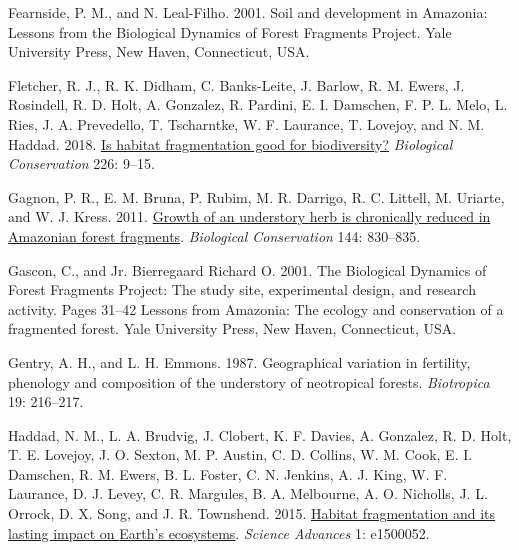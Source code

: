 \documentclass[
  12pt,
  man, donotrepeattitle,floatsintext]{apa6}
\newlength{\cslhangindent}
\newlength{\cslentryspacingunit} %
\newenvironment{CSLReferences}[2] %
 {%
  \setlength{\parindent}{0pt}
  \ifodd #1
  \let\oldpar\par
  \def\par{\hangindent=\cslhangindent\oldpar}
  \fi
  \setlength{\parskip}{#2\cslentryspacingunit}
 }%
 {}
\begin{document}
\begin{CSLReferences}{1}{0}
\leavevmode{}%
Fearnside, P. M., and N. Leal-Filho. 2001. Soil and development in {Amazonia}: {Lessons} from the {Biological} {Dynamics} of {Forest} {Fragments} {Project}. Yale University Press, New Haven, Connecticut, USA.

\leavevmode{}%
Fletcher, R. J., R. K. Didham, C. Banks-Leite, J. Barlow, R. M. Ewers, J. Rosindell, R. D. Holt, A. Gonzalez, R. Pardini, E. I. Damschen, F. P. L. Melo, L. Ries, J. A. Prevedello, T. Tscharntke, W. F. Laurance, T. Lovejoy, and N. M. Haddad. 2018. \href{https://doi.org/10.1016/j.biocon.2018.07.022}{Is habitat fragmentation good for biodiversity?} \emph{Biological Conservation} 226: 9--15.

\leavevmode{}%
Gagnon, P. R., E. M. Bruna, P. Rubim, M. R. Darrigo, R. C. Littell, M. Uriarte, and W. J. Kress. 2011. \href{https://doi.org/10.1016/j.biocon.2010.11.015}{Growth of an understory herb is chronically reduced in {Amazonian} forest fragments}. \emph{Biological Conservation} 144: 830--835.

\leavevmode{}%
Gascon, C., and Jr. Bierregaard Richard O. 2001. The {Biological} {Dynamics} of {Forest} {Fragments} {Project}: The study site, experimental design, and research activity. Pages 31--42 Lessons from {Amazonia}: The ecology and conservation of a fragmented forest. Yale University Press, New Haven, Connecticut, USA.

\leavevmode{}%
Gentry, A. H., and L. H. Emmons. 1987. Geographical variation in fertility, phenology and composition of the understory of neotropical forests. \emph{Biotropica} 19: 216--217.

\leavevmode{}%
Haddad, N. M., L. A. Brudvig, J. Clobert, K. F. Davies, A. Gonzalez, R. D. Holt, T. E. Lovejoy, J. O. Sexton, M. P. Austin, C. D. Collins, W. M. Cook, E. I. Damschen, R. M. Ewers, B. L. Foster, C. N. Jenkins, A. J. King, W. F. Laurance, D. J. Levey, C. R. Margules, B. A. Melbourne, A. O. Nicholls, J. L. Orrock, D. X. Song, and J. R. Townshend. 2015. \href{https://doi.org/10.1126/sciadv.1500052}{Habitat fragmentation and its lasting impact on {Earth}'s ecosystems}. \emph{Science Advances} 1: e1500052.


\end{CSLReferences}
\end{document}
